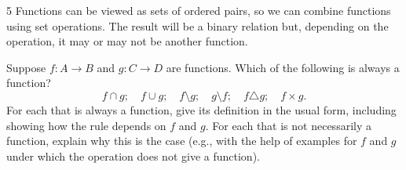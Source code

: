 \documentclass[11pt]{article}
\begin{document}
\begin{exercise}{5}
    Functions can be viewed as sets of ordered pairs, so we can
    combine functions using set operations. The result will be a
    binary relation but, depending on the operation, it may or may
    not be another function.

    Suppose $f: A\to B$ and $g: C\to D$ are functions. Which of the
    following is always a function?
    \[
        f\cap g;\quad f\cup g;\quad f\setminus g;\quad g\setminus f;
        \quad f\triangle g;\quad f\times g.
    \]
    For each that is always a function, give its definition in the
    usual form, including showing how the rule depends on $f$ and
    $g$. For each that is not necessarily a function, explain why
    this is the case (e.g., with the help of examples for $f$ and
    $g$ under which the operation does not give a function).
\end{exercise}
\end{document}
